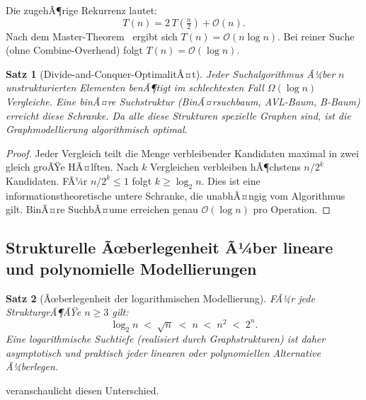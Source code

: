 ﻿\documentclass[12pt,a4paper,twoside]{article}
\theoremstyle{definition}
\theoremstyle{plain}
\newtheorem{theorem}{Satz}[section]
\theoremstyle{remark}
\begin{document}
\noindent
Die zugehÃ¶rige Rekurrenz lautet:
\[
  T(n) = 2\,T\!\left(\tfrac{n}{2}\right) + \mathcal{O}(n).
\]
Nach dem Master-Theorem~\cite{Cormen2009} ergibt sich
$T(n) = \mathcal{O}(n \log n)$.  Bei reiner Suche (ohne
Combine-Overhead) folgt $T(n)=\mathcal{O}(\log n)$.

\begin{theorem}[Divide-and-Conquer-OptimalitÃ¤t]
\label{thm:dc}
Jeder Suchalgorithmus Ã¼ber $n$ unstrukturierten Elementen
benÃ¶tigt im schlechtesten Fall $\Omega(\log n)$ Vergleiche.
Eine binÃ¤re Suchstruktur (BinÃ¤rsuchbaum, AVL-Baum, B-Baum)
erreicht diese Schranke.  Da alle diese Strukturen spezielle
Graphen sind, ist die Graphmodellierung algorithmisch optimal.
\end{theorem}

\begin{proof}
Jeder Vergleich teilt die Menge verbleibender Kandidaten maximal
in zwei gleich groÃŸe HÃ¤lften.  Nach $k$ Vergleichen verbleiben
hÃ¶chstens $n/2^k$ Kandidaten.  FÃ¼r $n/2^k \leq 1$ folgt
$k \geq \log_2 n$.  Dies ist eine informationstheoretische
untere Schranke, die unabhÃ¤ngig vom Algorithmus gilt.
BinÃ¤re SuchbÃ¤ume erreichen genau $\mathcal{O}(\log n)$ pro
Operation.
\end{proof}

\subsection{Strukturelle Ãœberlegenheit Ã¼ber lineare und
            polynomielle Modellierungen}

\begin{theorem}[Ãœberlegenheit der logarithmischen Modellierung]
\label{thm:superior}
FÃ¼r jede StrukturgrÃ¶ÃŸe $n \geq 3$ gilt:
\[
  \log_2 n \;<\; \sqrt{n} \;<\; n \;<\; n^2 \;<\; 2^n.
\]
Eine logarithmische Suchtiefe (realisiert durch Graphstrukturen)
ist daher asymptotisch und praktisch jeder linearen oder
polynomiellen Alternative Ã¼berlegen.
\end{theorem}

\noindent
{} veranschaulicht diesen Unterschied.
\end{document}
